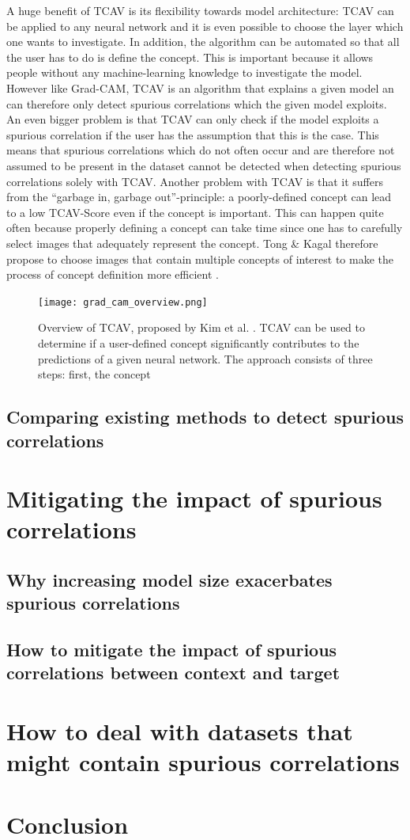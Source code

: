 \documentclass{article}
\begin{document}
A huge benefit of TCAV is its flexibility towards model architecture: TCAV can be applied to any neural network and it is even possible to choose the layer which one wants to investigate. In addition, the algorithm can be automated so that all the user has to do is define the concept. This is important because it allows people without any machine-learning knowledge to investigate the model. However like Grad-CAM, TCAV is an algorithm that explains a given model an can therefore only detect spurious correlations which the given model exploits. An even bigger problem is that TCAV can only check if the model exploits a spurious correlation if the user has the assumption that this is the case. This means that spurious correlations which do not often occur and are therefore not assumed to be present in the dataset cannot be detected when detecting spurious correlations solely with TCAV. Another problem with TCAV is that it suffers from the \enquote{garbage in, garbage out}-principle: a poorly-defined concept can lead to a low TCAV-Score even if the concept is important. This can happen quite often because properly defining a concept can take time since one has to carefully select images that adequately represent the concept. Tong \& Kagal therefore propose to choose images that contain multiple concepts of interest to make the process of concept definition more efficient \cite{tong2020investigating}.

\begin{figure}
    \centering
    \texttt{[image: grad\_cam\_overview.png]}
    \caption{Overview of TCAV, proposed by Kim et al. \cite{pmlr-v80-kim18d}. TCAV can be used to determine if a user-defined concept significantly contributes to the predictions of a given neural network. The approach consists of three steps: first, the concept }
    \label{fig:tcav}
\end{figure}


\subsection{Comparing existing methods to detect spurious correlations}

\section{Mitigating the impact of spurious correlations}
\subsection{Why increasing model size exacerbates spurious correlations}
\subsection{How to mitigate the impact of spurious correlations between context and target}

\section{How to deal with datasets that might contain spurious correlations}

\section{Conclusion}

\printbibliography
\end{document}
